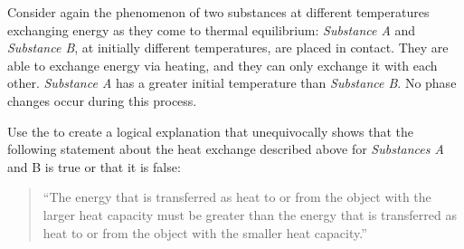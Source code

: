 \label{FNT1.2.1-1}

Consider again the phenomenon of two substances at different temperatures exchanging energy as they come to thermal equilibrium: \emph{Substance A} and \emph{Substance B}, at initially different temperatures, are placed in contact. They are able to exchange energy via heating, and they can only exchange it with each other. \emph{Substance A} has a greater initial temperature than \emph{Substance B}. No phase changes occur during this process.

Use the \EnergyInteractionModel{} to create a logical explanation that unequivocally shows that the following statement about the heat exchange described above for \emph{Substances A} and {B} is true or that it is false:

\begin{quote}
	``The energy that is transferred as heat to or from the object with the larger heat capacity must be greater than the energy that is transferred as heat to or from the object with the smaller heat capacity.''
\end{quote}